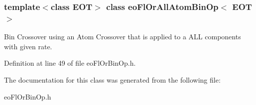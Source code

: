 \subsubsection*{template$<$class EOT$>$ class eo\-Fl\-Or\-All\-Atom\-Bin\-Op$<$ EOT $>$}

Bin Crossover using an Atom Crossover that is applied to a ALL components with given rate. 



Definition at line 49 of file eo\-Fl\-Or\-Bin\-Op.h.

The documentation for this class was generated from the following file:\begin{CompactItemize}
\item 
eo\-Fl\-Or\-Bin\-Op.h\end{CompactItemize}

